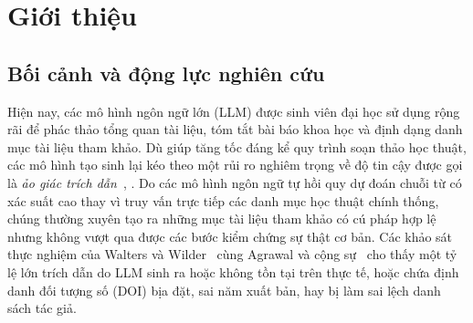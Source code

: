 \chapter{Giới thiệu}
\label{chap:introduction}

\section{Bối cảnh và động lực nghiên cứu}

Hiện nay, các mô hình ngôn ngữ lớn (LLM) được sinh viên đại học sử dụng rộng rãi để phác thảo tổng quan tài liệu, tóm tắt bài báo khoa học và định dạng danh mục tài liệu tham khảo. Dù giúp tăng tốc đáng kể quy trình soạn thảo học thuật, các mô hình tạo sinh lại kéo theo một rủi ro nghiêm trọng về độ tin cậy được gọi là \emph{ảo giác trích dẫn}~\cite{Ji2023}, \cite{huang2025hallucination}. Do các mô hình ngôn ngữ tự hồi quy dự đoán chuỗi từ có xác suất cao thay vì truy vấn trực tiếp các danh mục học thuật chính thống, chúng thường xuyên tạo ra những mục tài liệu tham khảo có cú pháp hợp lệ nhưng không vượt qua được các bước kiểm chứng sự thật cơ bản. Các khảo sát thực nghiệm của Walters và Wilder~\cite{walters2023fabrication} cùng Agrawal và cộng sự~\cite{agrawal2024hallucinating} cho thấy một tỷ lệ lớn trích dẫn do LLM sinh ra hoặc không tồn tại trên thực tế, hoặc chứa định danh đối tượng số (DOI) bịa đặt, sai năm xuất bản, hay bị làm sai lệch danh sách tác giả.


